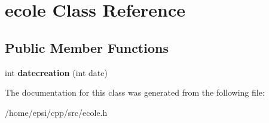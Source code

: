 \hypertarget{classecole}{}\section{ecole Class Reference}
\label{classecole}
\subsection*{Public Member Functions}
\begin{DoxyCompactItemize}
\item 
\mbox{\label{classecole_a8e00c3ec442d19500b03734ffae9f2a0}} 
int {\bfseries datecreation} (int date)
\end{DoxyCompactItemize}


The documentation for this class was generated from the following file\+:\begin{DoxyCompactItemize}
\item 
/home/epsi/cpp/src/ecole.\+h\end{DoxyCompactItemize}

